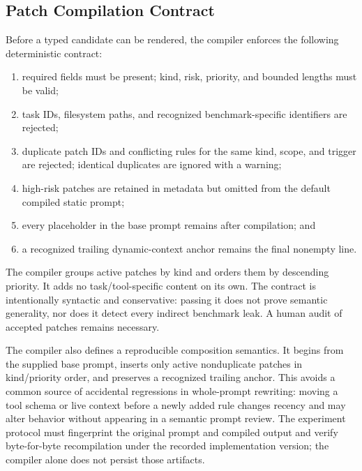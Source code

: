 \documentclass[10pt]{article}
\begin{document}
\subsection{Patch Compilation Contract}
Before a typed candidate can be rendered, the compiler enforces the following deterministic contract:
\begin{enumerate}
\item required fields must be present; kind, risk, priority, and bounded lengths must be valid;
\item task IDs, filesystem paths, and recognized benchmark-specific identifiers are rejected;
\item duplicate patch IDs and conflicting rules for the same kind, scope, and trigger are rejected; identical duplicates are ignored with a warning;
\item high-risk patches are retained in metadata but omitted from the default compiled static prompt;
\item every placeholder in the base prompt remains after compilation; and
\item a recognized trailing dynamic-context anchor remains the final nonempty line.
\end{enumerate}
The compiler groups active patches by kind and orders them by descending priority. It adds no task/tool-specific content on its own. The contract is intentionally syntactic and conservative: passing it does not prove semantic generality, nor does it detect every indirect benchmark leak. A human audit of accepted patches remains necessary.

The compiler also defines a reproducible composition semantics. It begins from the supplied base prompt, inserts only active nonduplicate patches in kind/priority order, and preserves a recognized trailing anchor. This avoids a common source of accidental regressions in whole-prompt rewriting: moving a tool schema or live context before a newly added rule changes recency and may alter behavior without appearing in a semantic prompt review. The experiment protocol must fingerprint the original prompt and compiled output and verify byte-for-byte recompilation under the recorded implementation version; the compiler alone does not persist those artifacts.
\end{document}
